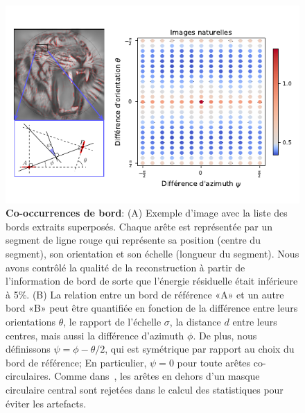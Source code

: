 \documentclass[11pt,french,a4paper,oneside]{article}%
\begin{document}
\begin{figure}%
\centerline{%
\includegraphics[width=\linewidth]{figure_synthesis_FR.pdf}
}
\caption{
\textbf{Co-occurrences de bord}:
 (A) Exemple d'image avec la liste des bords extraits superposés. Chaque arête est représentée par un segment de ligne rouge qui représente sa position (centre du segment), son orientation et son échelle (longueur du segment). Nous avons contrôlé la qualité de la reconstruction à partir de l'information de bord de sorte que l'énergie résiduelle était inférieure à 5\%. (B) La relation entre un bord de référence «A» et un autre bord «B» peut être quantifiée en fonction de la différence entre leurs orientations $\theta $, le rapport de l'échelle $\sigma $, la distance $ d $ entre leurs centres, mais aussi la différence d'azimuth $\phi $. De plus, nous définissons $\psi =\phi -\theta / 2 $, qui est symétrique par rapport au choix du bord de référence; En particulier, $\psi = 0 $ pour toute arêtes co-circulaires. Comme dans~\citet {Geisler01}, les arêtes en dehors d'un masque circulaire central sont rejetées dans le calcul des statistiques pour éviter les artefacts.
%
 }%
\label{fig:PerrinetBednar15}%
\end{figure}%
\end{document}
